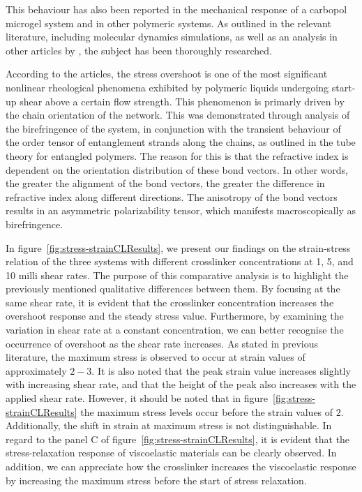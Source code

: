This behaviour has also been reported in the mechanical response of a carbopol microgel system\citep{divouxStressOvershootSimple2011} and in other polymeric systems\citep{osakiStressOvershootPolymer2000a,ravindranathUniversalScalingCharacteristics2008,boukanyUniversalScalingBehavior2009}.
As outlined in the relevant literature, including molecular dynamics simulations\citep{jeongEffectChainOrientation2017,caoSimulatingStartupShear2015,mohagheghiMolecularlyBasedCriteria2016,baigFlowEffectsMelt2010a}, as well as an analysis in other articles by \citep{wangExploringStressOvershoot2009}, the subject has been thoroughly researched.

According to the articles\citep{jeongEffectChainOrientation2017,janeschitz-krieglPolymerMeltRheology1983,pearsonFlowInducedBirefringenceConcentrated1989,masubuchiPrimitiveChainNetwork2020}, the stress overshoot is one of the most significant nonlinear rheological phenomena exhibited by polymeric liquids undergoing start-up shear above a certain flow strength.
This phenomenon is primarly driven by the chain orientation of the network.
This was demonstrated through analysis of the birefringence of the system, in conjunction with the transient behaviour of the order tensor of entanglement strands along the chains, as outlined in the tube theory for entangled polymers.
The reason for this is that the refractive index is dependent on the orientation distribution of these bond vectors. 
In other words, the greater the alignment of the bond vectors, the greater the difference in refractive index along different directions. 
The anisotropy of the bond vectors results in an asymmetric polarizability tensor, which manifests macroscopically as birefringence.

In figure~\ref{fig:stress-strainCLResults}, we present our findings on the strain-stress relation of the three systems with different crosslinker concentrations at \num{1}, \num{5}, and \num{10} milli shear rates.
The purpose of this comparative analysis is to highlight the previously mentioned qualitative differences between them.
By focusing at the same shear rate, it is evident that the crosslinker concentration increases the overshoot response and the steady stress value.
Furthermore, by examining the variation in shear rate at a constant concentration, we can better recognise the occurrence of overshoot as the shear rate increases.
As stated in previous literature, the maximum stress is observed to occur at strain values of approximately $2-3$.
It is also noted that the peak strain value increases slightly with increasing shear rate, and that the height of the peak also increases with the applied shear rate.
However, it should be noted that in figure~\ref{fig:stress-strainCLResults} the maximum stress levels occur before the strain values of $2$. 
Additionally, the shift in strain at maximum stress is not distinguishable.
In regard to the panel C of figure~\ref{fig:stress-strainCLResults}, it is evident that the stress-relaxation response of viscoelastic materials can be clearly observed.
In addition, we can appreciate how the crosslinker increases the viscoelastic response by increasing the maximum stress before the start of stress relaxation.

